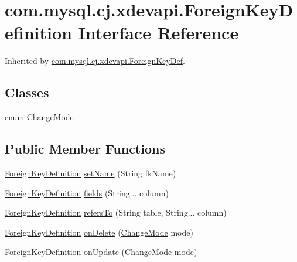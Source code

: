 \hypertarget{interfacecom_1_1mysql_1_1cj_1_1xdevapi_1_1_foreign_key_definition}{}\section{com.\+mysql.\+cj.\+xdevapi.\+Foreign\+Key\+Definition Interface Reference}
\label{interfacecom_1_1mysql_1_1cj_1_1xdevapi_1_1_foreign_key_definition}


Inherited by \mbox{\hyperlink{classcom_1_1mysql_1_1cj_1_1xdevapi_1_1_foreign_key_def}{com.\+mysql.\+cj.\+xdevapi.\+Foreign\+Key\+Def}}.

\subsection*{Classes}
\begin{DoxyCompactItemize}
\item 
enum \mbox{\hyperlink{enumcom_1_1mysql_1_1cj_1_1xdevapi_1_1_foreign_key_definition_1_1_change_mode}{Change\+Mode}}
\end{DoxyCompactItemize}
\subsection*{Public Member Functions}
\begin{DoxyCompactItemize}
\item 
\mbox{\hyperlink{interfacecom_1_1mysql_1_1cj_1_1xdevapi_1_1_foreign_key_definition}{Foreign\+Key\+Definition}} \mbox{\hyperlink{interfacecom_1_1mysql_1_1cj_1_1xdevapi_1_1_foreign_key_definition_a463ad3b32013c0394c4bb428a70fd247}{set\+Name}} (String fk\+Name)
\item 
\mbox{\hyperlink{interfacecom_1_1mysql_1_1cj_1_1xdevapi_1_1_foreign_key_definition}{Foreign\+Key\+Definition}} \mbox{\hyperlink{interfacecom_1_1mysql_1_1cj_1_1xdevapi_1_1_foreign_key_definition_aa7d8e7f02ea79f326fd65479d21e2b1f}{fields}} (String... column)
\item 
\mbox{\hyperlink{interfacecom_1_1mysql_1_1cj_1_1xdevapi_1_1_foreign_key_definition}{Foreign\+Key\+Definition}} \mbox{\hyperlink{interfacecom_1_1mysql_1_1cj_1_1xdevapi_1_1_foreign_key_definition_a0d3e1863c4bc69c9b03c8f573bf6bc39}{refers\+To}} (String table, String... column)
\item 
\mbox{\hyperlink{interfacecom_1_1mysql_1_1cj_1_1xdevapi_1_1_foreign_key_definition}{Foreign\+Key\+Definition}} \mbox{\hyperlink{interfacecom_1_1mysql_1_1cj_1_1xdevapi_1_1_foreign_key_definition_aa73492ff5719b928485ce4c0e8be7e6d}{on\+Delete}} (\mbox{\hyperlink{enumcom_1_1mysql_1_1cj_1_1xdevapi_1_1_foreign_key_definition_1_1_change_mode}{Change\+Mode}} mode)
\item 
\mbox{\hyperlink{interfacecom_1_1mysql_1_1cj_1_1xdevapi_1_1_foreign_key_definition}{Foreign\+Key\+Definition}} \mbox{\hyperlink{interfacecom_1_1mysql_1_1cj_1_1xdevapi_1_1_foreign_key_definition_ae6593612ed4d784bd6da0eac83ea51cd}{on\+Update}} (\mbox{\hyperlink{enumcom_1_1mysql_1_1cj_1_1xdevapi_1_1_foreign_key_definition_1_1_change_mode}{Change\+Mode}} mode)
\end{DoxyCompactItemize}


